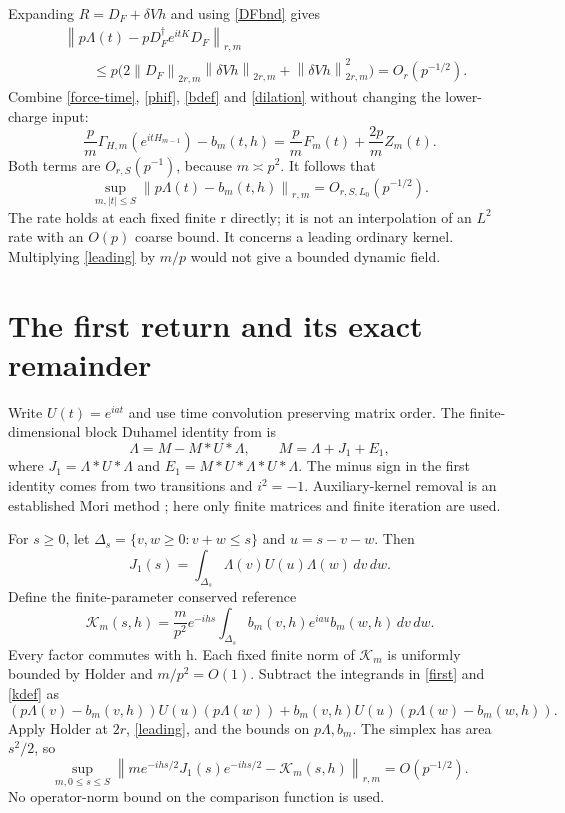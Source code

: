 \documentclass[11pt]{article}
\newcommand{\norm}[1]{\left\lVert#1\right\rVert}
\begin{document}
Expanding $R=D_F+\delta Vh$ and using \eqref{DFbnd} gives
\begin{align}
 &\norm{p\Lambda(t)-pD_F^\dagger e^{itK}D_F}_{r,m}\nonumber\\
 &\qquad\le p\bigl(2\norm{D_F}_{2r,m}\norm{\delta Vh}_{2r,m}
                         +\norm{\delta Vh}_{2r,m}^2\bigr)
 =O_r(p^{-1/2}).\label{shift-error}
\end{align}
Combine \eqref{force-time}, \eqref{phif}, \eqref{bdef} and
\eqref{dilation} without changing the lower-charge input:
\begin{equation}\label{force-b}
 \frac p m\Gamma_{H,m}(e^{itH_{m-1}})-b_m(t,h)
   =\frac p m F_m(t)+\frac{2p}{m}Z_m(t).
\end{equation}
Both terms are $O_{r,S}(p^{-1})$, because $m\asymp p^2$.
It follows that
\begin{equation}\label{leading}
 \sup_{m,|t|\le S}\norm{p\Lambda(t)-b_m(t,h)}_{r,m}
       =O_{r,S,L_0}(p^{-1/2}).
\end{equation}
The rate holds at each fixed finite r directly; it is not an
interpolation of an $L^2$ rate with an $O(p)$ coarse bound.
It concerns a leading ordinary kernel. Multiplying
\eqref{leading} by $m/p$ would not give a bounded dynamic field.

\newpage
\section{The first return and its exact remainder}
Write $U(t)=e^{iat}$ and use time convolution preserving matrix
order. The finite-dimensional block Duhamel identity from
\cite{return} is
\[
 \Lambda=M-M*U*\Lambda,\qquad
 M=\Lambda+J_1+E_1,
\]
where $J_1=\Lambda*U*\Lambda$ and
$E_1=M*U*\Lambda*U*\Lambda$. The minus sign in the first
identity comes from two transitions and $i^2=-1$.
Auxiliary-kernel removal is an established Mori method
\cite{mori}; here only finite matrices and finite iteration are used.

For $s\ge0$, let $\Delta_s=\{v,w\ge0:v+w\le s\}$ and
$u=s-v-w$. Then
\begin{equation}\label{first}
 J_1(s)=\int_{\Delta_s}\Lambda(v)U(u)\Lambda(w)\,dv\,dw.
\end{equation}
Define the finite-parameter conserved reference
\begin{equation}\label{kdef}
 \mathcal K_m(s,h)=\frac m{p^2}e^{-ihs}
 \int_{\Delta_s}b_m(v,h)e^{iau}b_m(w,h)\,dv\,dw.
\end{equation}
Every factor commutes with h. Each fixed finite norm of
$\mathcal K_m$ is uniformly bounded by Holder and $m/p^2=O(1)$.
Subtract the integrands in \eqref{first} and \eqref{kdef} as
\[
 (p\Lambda(v)-b_m(v,h))U(u)(p\Lambda(w))
       +b_m(v,h)U(u)(p\Lambda(w)-b_m(w,h)).
\]
Apply Holder at $2r$, \eqref{leading}, and the bounds on
$p\Lambda,b_m$. The simplex has area $s^2/2$, so
\begin{equation}\label{first-error}
 \sup_{m,0\le s\le S}
 \norm{m e^{-ihs/2}J_1(s)e^{-ihs/2}-\mathcal K_m(s,h)}_{r,m}
       =O(p^{-1/2}).
\end{equation}
No operator-norm bound on the comparison function is used.
\end{document}
